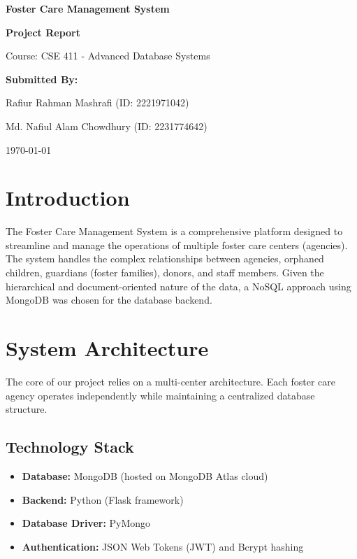 \documentclass[12pt,a4paper]{article}
\begin{document}
\begin{titlepage}
    \centering
    \vspace*{2cm}
    
    {\Huge\bfseries Foster Care Management System\par}
    \vspace{1.5cm}
    {\Large\bfseries Project Report\par}
    \vspace{2cm}
    
    {\Large Course: CSE 411 - Advanced Database Systems\par}
    \vspace{2.5cm}
    
    {\Large \textbf{Submitted By:}\par}
    \vspace{0.5cm}
    {\Large Rafiur Rahman Mashrafi (ID: 2221971042)\par}
    \vspace{0.2cm}
    {\Large Md. Nafiul Alam Chowdhury (ID: 2231774642)\par}
    
    \vfill
    {\Large \today\par}
\end{titlepage}

\tableofcontents
\newpage

\section{Introduction}
The Foster Care Management System is a comprehensive platform designed to streamline and manage the operations of multiple foster care centers (agencies). The system handles the complex relationships between agencies, orphaned children, guardians (foster families), donors, and staff members. Given the hierarchical and document-oriented nature of the data, a NoSQL approach using MongoDB was chosen for the database backend.

\section{System Architecture}
The core of our project relies on a multi-center architecture. Each foster care agency operates independently while maintaining a centralized database structure. 

\subsection{Technology Stack}
\begin{itemize}
    \item \textbf{Database:} MongoDB (hosted on MongoDB Atlas cloud)
    \item \textbf{Backend:} Python (Flask framework)
    \item \textbf{Database Driver:} PyMongo
    \item \textbf{Authentication:} JSON Web Tokens (JWT) and Bcrypt hashing
\end{itemize}
\end{document}
